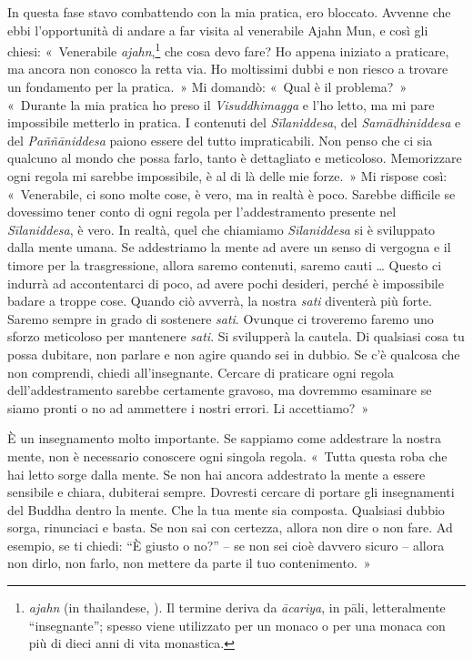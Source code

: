 In questa fase stavo combattendo con la mia pratica, ero bloccato.
Avvenne che ebbi l'opportunità di andare a far visita al venerabile
Ajahn Mun, e così gli chiesi: «~Venerabile \emph{ajahn},\footnote{\emph{ajahn}
  (in thailandese, \href{http://www.thai2english.com/dictionary/1453955.html}{}).
  Il termine deriva da \emph{ācariya}, in pāli, letteralmente
  ``insegnante''; spesso viene utilizzato per un monaco o per una monaca
  con più di dieci anni di vita monastica.} che cosa devo fare? Ho
appena iniziato a praticare, ma ancora non conosco la retta via. Ho
moltissimi dubbi e non riesco a trovare un fondamento per la pratica.~»
Mi domandò: «~Qual è il problema?~» «~Durante la mia pratica ho preso il
\emph{Visuddhimagga} e l'ho letto, ma mi pare impossibile metterlo in
pratica. I contenuti del \emph{Sīlaniddesa}, del \emph{Samādhiniddesa} e
del \emph{Paññāniddesa} paiono essere del tutto impraticabili. Non penso
che ci sia qualcuno al mondo che possa farlo, tanto è dettagliato e
meticoloso. Memorizzare ogni regola mi sarebbe impossibile, è al di là
delle mie forze.~» Mi rispose così: «~Venerabile, ci sono molte cose, è
vero, ma in realtà è poco. Sarebbe difficile se dovessimo tener conto di
ogni regola per l'addestramento presente nel \emph{Sīlaniddesa}, è vero.
In realtà, quel che chiamiamo \emph{Sīlaniddesa} si è sviluppato dalla
mente umana. Se addestriamo la mente ad avere un senso di vergogna e il
timore per la trasgressione, allora saremo contenuti, saremo cauti \ldots{}
Questo ci indurrà ad accontentarci di poco, ad avere pochi desideri,
perché è impossibile badare a troppe cose. Quando ciò avverrà, la nostra
\emph{sati} diventerà più forte. Saremo sempre in grado di sostenere
\emph{sati}. Ovunque ci troveremo faremo uno sforzo meticoloso per
mantenere \emph{sati}. Si svilupperà la cautela. Di qualsiasi cosa tu
possa dubitare, non parlare e non agire quando sei in dubbio. Se c'è
qualcosa che non comprendi, chiedi all'insegnante. Cercare di praticare
ogni regola dell'addestramento sarebbe certamente gravoso, ma dovremmo
esaminare se siamo pronti o no ad ammettere i nostri errori. Li
accettiamo?~»

È un insegnamento molto importante. Se sappiamo come addestrare la
nostra mente, non è necessario conoscere ogni singola regola. «~Tutta
questa roba che hai letto sorge dalla mente. Se non hai ancora
addestrato la mente a essere sensibile e chiara, dubiterai sempre.
Dovresti cercare di portare gli insegnamenti del Buddha dentro la mente.
Che la tua mente sia composta. Qualsiasi dubbio sorga, rinunciaci e
basta. Se non sai con certezza, allora non dire o non fare. Ad esempio,
se ti chiedi: ``È giusto o no?'' -- se non sei cioè davvero sicuro --
allora non dirlo, non farlo, non mettere da parte il tuo contenimento.~»

